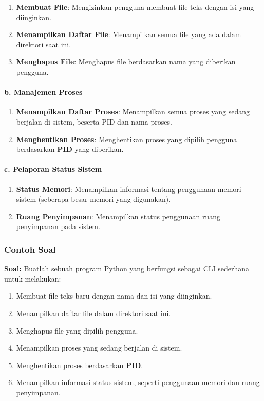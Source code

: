 \documentclass[12pt]{article}
\begin{document}
\begin{enumerate}
    \item \textbf{Membuat File}: Mengizinkan pengguna membuat file teks dengan isi yang diinginkan.
    \item \textbf{Menampilkan Daftar File}: Menampilkan semua file yang ada dalam direktori saat ini.
    \item \textbf{Menghapus File}: Menghapus file berdasarkan nama yang diberikan pengguna.
\end{enumerate}

\paragraph{b. \textbf{Manajemen Proses}}

\begin{enumerate}
    \item \textbf{Menampilkan Daftar Proses}: Menampilkan semua proses yang sedang berjalan di sistem, beserta PID dan nama proses.
    \item \textbf{Menghentikan Proses}: Menghentikan proses yang dipilih pengguna berdasarkan \textbf{PID} yang diberikan.
\end{enumerate}

\paragraph{c. \textbf{Pelaporan Status Sistem}}

\begin{enumerate}
    \item \textbf{Status Memori}: Menampilkan informasi tentang penggunaan memori sistem (seberapa besar memori yang digunakan).
    \item \textbf{Ruang Penyimpanan}: Menampilkan status penggunaan ruang penyimpanan pada sistem.
\end{enumerate}


\subsubsection{\textbf{Contoh Soal}}

\textbf{Soal:} Buatlah sebuah program Python yang berfungsi sebagai CLI sederhana untuk melakukan:

\begin{enumerate}
    \item Membuat file teks baru dengan nama dan isi yang diinginkan.
    \item Menampilkan daftar file dalam direktori saat ini.
    \item Menghapus file yang dipilih pengguna.
    \item Menampilkan proses yang sedang berjalan di sistem.
    \item Menghentikan proses berdasarkan \textbf{PID}.
    \item Menampilkan informasi status sistem, seperti penggunaan memori dan ruang penyimpanan.
\end{enumerate}
\end{document}
